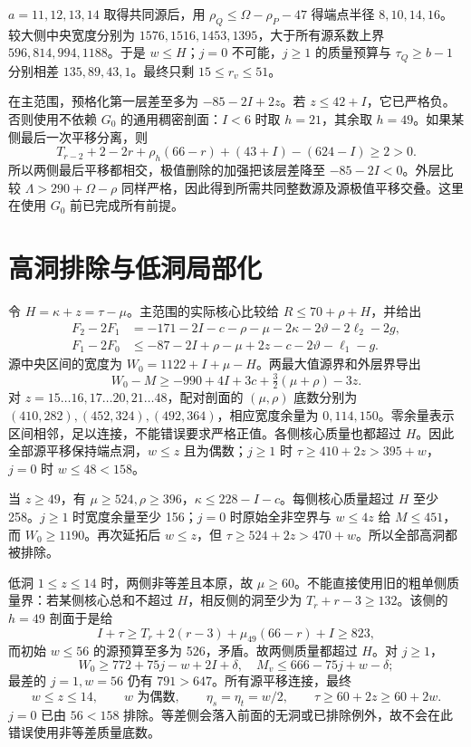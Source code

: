 \documentclass[11pt,a4paper]{article}
\begin{document}
\(a=11,12,13,14\) 取得共同源后，用 \(\rho_Q\le\Omega-\rho_P-47\)
得端点半径 \(8,10,14,16\)。较大侧中央宽度分别为
\(1576,1516,1453,1395\)，大于所有源系数上界 \(596,814,994,1188\)。于是
\(w\le H\)；\(j=0\) 不可能，\(j\ge1\) 的质量预算与 \(\tau_Q\ge b-1\)
分别相差 \(135,89,43,1\)。最终只剩 \(15\le r_v\le51\)。

在主范围，预格化第一层差至多为 \(-85-2I+2z\)。若
\(z\le42+I\)，它已严格负。否则使用不依赖 \(G_0\) 的通用稠密剖面：\(I<6\)
时取 \(h=21\)，其余取 \(h=49\)。如果某侧最后一次平移分离，则 \[
 T_{r-2}+2-2r+\rho_h(66-r)+(43+I)-(624-I)\ge2>0.
\] 所以两侧最后平移都相交，极值删除的加强把该层差降至
\(-85-2I<0\)。外层比较 \(\Lambda>290+\Omega-\rho\)
同样严格，因此得到所需共同整数源及源极值平移交叠。这里在使用 \(G_0\)
前已完成所有前提。

\hypertarget{ux9ad8ux6d1eux6392ux9664ux4e0eux4f4eux6d1eux5c40ux90e8ux5316}{%
\section{高洞排除与低洞局部化}\label{ux9ad8ux6d1eux6392ux9664ux4e0eux4f4eux6d1eux5c40ux90e8ux5316}}

令 \(H=\kappa+z=\tau-\mu\)。主范围的实际核心比较给
\(R\le70+\rho+H\)，并给出 \[
 \begin{aligned}
 F_2-2F_1&=-171-2I-c-\rho-\mu-2\kappa-2\vartheta-2\ell_2-2g,\\
 F_1-2F_0&\le-87-2I+\rho-\mu+2z-c-2\vartheta-\ell_1-g.
 \end{aligned}
\] 源中央区间的宽度为 \(W_0=1122+I+\mu-H\)。两最大值源界和外层界导出 \[
 W_0-M\ge-990+4I+3c+\tfrac32(\mu+\rho)-3z.
\] 对 \(z=15\ldots16,17\ldots20,21\ldots48\)，配对剖面的 \((\mu,\rho)\)
底数分别为 \((410,282),(452,324),(492,364)\)，相应宽度余量为
\(0,114,150\)。零余量表示区间相邻，足以连接，不能错误要求严格正值。各侧核心质量也都超过
\(H\)。因此全部源平移保持端点洞，\(w\le z\) 且为偶数；\(j\ge1\) 时
\(\tau\ge410+2z>395+w\)，\(j=0\) 时 \(w\le48<158\)。

当 \(z\ge49\)，有
\(\mu\ge524,\rho\ge396\)，\(\kappa\le228-I-c\)。每侧核心质量超过 \(H\)
至少 258。\(j\ge1\) 时宽度余量至少 156；\(j=0\) 时原始全非空界与
\(w\le4z\) 给 \(M\le451\)，而 \(W_0\ge1190\)。再次延拓后 \(w\le z\)，但
\(\tau\ge524+2z>470+w\)。所以全部高洞都被排除。

低洞 \(1\le z\le14\) 时，两侧非等差且本原，故
\(\mu\ge60\)。不能直接使用旧的粗单侧质量界：若某侧核心总和不超过
\(H\)，相反侧的洞至少为 \(T_r+r-3\ge132\)。该侧的 \(h=49\) 剖面于是给 \[
 I+\tau\ge T_r+2(r-3)+\mu_{49}(66-r)+I\ge823,
\] 而初始 \(w\le56\) 的源预算至多为 526，矛盾。故两侧质量都超过
\(H\)。对 \(j\ge1\)， \[
 W_0\ge772+75j-w+2I+\delta,
 \quad M_v\le666-75j+w-\delta;
\] 最差的 \(j=1,w=56\) 仍有 \(791>647\)。所有源平移连接，最终 \[
 w\le z\le14,\qquad w\text{ 为偶数},\qquad \eta_s=\eta_t=w/2,
 \qquad \tau\ge60+2z\ge60+2w.
\] \(j=0\) 已由 \(56<158\)
排除。等差侧会落入前面的无洞或已排除例外，故不会在此错误使用非等差质量底数。
\end{document}
